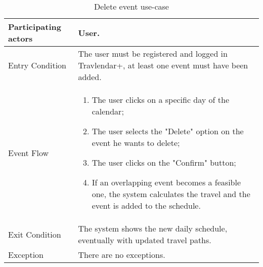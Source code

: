 \begin{table}[H]
	\begin{center}
		\begin{tabular}{ | p{} | p{} | }
		\hline
		Participating actors &  User.\\
		\hline
		Entry Condition & The user must be registered and logged in Travlendar+, at least one event must have been added.\\
		\hline
		Event Flow & 
			\begin{enumerate}
				\item The user clicks on a specific day of the calendar;
				\item The user selects the "Delete" option on the event he wants to delete;
				\item The user clicks on the "Confirm" button;
				\item If an overlapping event becomes a feasible one, the system calculates the travel and the event is added to the schedule.
			\end{enumerate} \\
		\hline
		Exit Condition & The system shows the new daily schedule, eventually with updated travel paths. \\
		\hline
		Exception & There are no exceptions.\\ 
		\hline
		\end{tabular}
	\end{center}
	\caption{Delete event use-case}
\end{table}